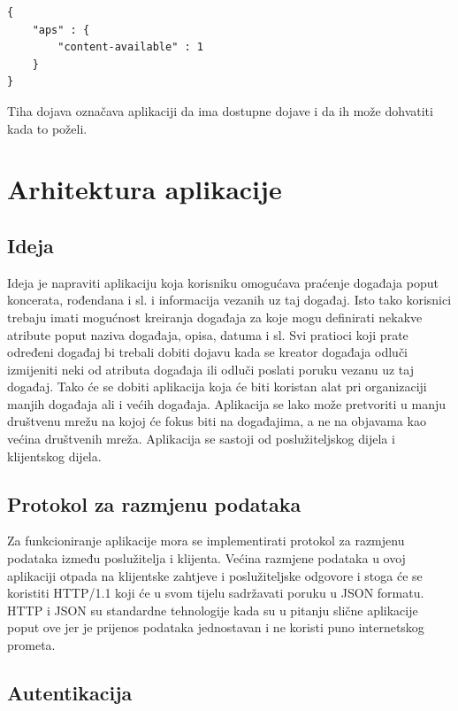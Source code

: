 \documentclass[times, utf8, zavrsni]{fer}
\begin{document}
\begin{lstlisting}[caption=JSON objekt za \glqq tihu\grqq\  dojavu, label=lst:tiha-dojava, float]
{
    "aps" : {
        "content-available" : 1
    }
}
\end{lstlisting}

Tiha dojava označava aplikaciji da ima dostupne dojave i da ih može dohvatiti kada to poželi.\citep{apns2017}

\chapter{Arhitektura aplikacije}

\section{Ideja}
Ideja je napraviti aplikaciju koja korisniku omogućava praćenje događaja poput koncerata, rođendana i sl. i informacija vezanih uz taj događaj. Isto tako korisnici trebaju imati mogućnost kreiranja događaja za koje mogu definirati nekakve atribute poput naziva događaja, opisa, datuma i sl. Svi pratioci koji prate određeni događaj bi trebali dobiti dojavu kada se kreator događaja odluči izmijeniti neki od atributa događaja ili odluči poslati poruku vezanu uz taj događaj. Tako će se dobiti aplikacija koja će biti koristan alat pri organizaciji manjih događaja ali i većih događaja. Aplikacija se lako može pretvoriti u manju društvenu mrežu na kojoj će fokus biti na događajima, a ne na objavama kao većina društvenih mreža. Aplikacija se sastoji od poslužiteljskog dijela i klijentskog dijela.

\section{Protokol za razmjenu podataka}

Za funkcioniranje aplikacije mora se implementirati protokol za razmjenu podataka između poslužitelja i klijenta. Većina razmjene podataka u ovoj aplikaciji otpada na klijentske zahtjeve i poslužiteljske odgovore i stoga će se koristiti HTTP/1.1 koji će u svom tijelu sadržavati poruku u JSON formatu. HTTP i JSON su standardne tehnologije kada su u pitanju slične aplikacije poput ove jer je prijenos podataka jednostavan i ne koristi puno internetskog prometa.

\section{Autentikacija}
\end{document}
